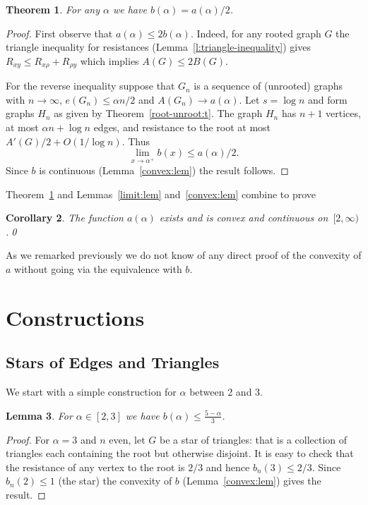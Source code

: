 \documentclass[11pt]{article}
\newtheorem{theorem}{Theorem}
\newtheorem{lemma}[theorem]{Lemma}
\newtheorem{corollary}[theorem]{Corollary}
\theoremstyle{remark}
\def\a{\alpha}
\begin{document}
\begin{theorem}\label{root=unroot:t}
  For any $\alpha$ we have $b(\alpha)=a(\alpha)/2$.
\end{theorem}
\begin{proof}
  First observe that $a(\alpha)\le 2b(\alpha)$. Indeed, for any rooted
  graph $G$ the triangle inequality for resistances
  (Lemma~\ref{l:triangle-inequality}) gives $R_{xy}\le R_{x\rho}+R_{\rho y}$
  which implies $A(G)\le 2B(G)$.

  For the reverse inequality suppose that $G_n$ is a sequence of (unrooted)
  graphs with $n\to \infty$, $e(G_n)\le \alpha n/2$ and $A(G_n)\to
  a(\alpha)$. Let $s=\log n$ and form graphs $H_n$ as given by
  Theorem~\ref{root-unroot:t}. The graph $H_n$ has $n+1$ vertices, at
  most $\alpha n +\log n$ edges, and resistance to the root at most
  $A'(G)/2+O(1/\log n)$. Thus
\[
\lim_{x\to \alpha^+}b(x)\le a(\alpha)/2.
\]
Since $b$ is continuous (Lemma~\ref{convex:lem}) the result follows.
\end{proof}
Theorem~\ref{root=unroot:t} and Lemmas~\ref{limit:lem}
and~\ref{convex:lem} combine to prove
\begin{corollary}
  The function $a(\a)$ exists and is convex and continuous on~$[2,\infty)$.\qed
\end{corollary}
As we remarked previously we do not know of any direct proof of the
convexity of $a$ without going via the equivalence with $b$.

\section{Constructions}\label{s:upper}

\subsection{Stars of Edges and Triangles}

We start with a simple construction for $\alpha$ between 2 and 3.
\begin{lemma}\label{star:lem}
For $\a\in[2,3]$ we have  $b(\a)\leq\frac{5-\a}{3}$.
\end{lemma}
\begin{proof}
  For $\a=3$ and $n$ even, let $G$ be a star of triangles: that is a
  collection of triangles each containing the root but otherwise
  disjoint. It is easy to check that the resistance of any vertex to
  the root is $2/3$ and hence $b_n(3)\le 2/3$. Since $b_n(2)\le 1$ (the
  star) the convexity of $b$ (Lemma~\ref{convex:lem}) gives the result.
\end{proof}
\end{document}
